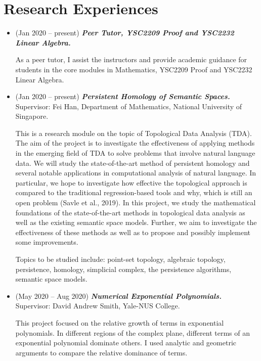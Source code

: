 \documentclass[11pt,reqno,oneside,a4paper]{article}
\begin{document}
	\section{Research Experiences}
	\begin{itemize}
		
		\item (Jan 2020 -- present) \emph{\textbf{Peer Tutor, \emph{YSC2209 Proof} and \emph{YSC2232 Linear Algebra}.}}
		
		\par As a peer tutor, I assist the instructors and provide academic guidance for students in the core modules in Mathematics, YSC2209 Proof and YSC2232 Linear Algebra. 
		
		\item (Jan 2020 -- present) \emph{\textbf{Persistent Homology of Semantic Spaces.}}\\
		Supervisor: Fei Han, Department of Mathematics, National University of Singapore.
		
		\par This is a research module on the topic of Topological Data Analysis (TDA). The aim of the project is to investigate the effectiveness of applying methods in the emerging field of TDA to solve problems that involve natural language data. We will study the state-of-the-art method of persistent homology and several notable applications in computational analysis of natural language. In particular, we hope to investigate how effective the topological approach is compared to the traditional regression-based tools and why, which is still an open problem (Savle et al., 2019). In this project, we study the mathematical foundations of the state-of-the-art methods in topological data analysis as well as the existing semantic space models. Further, we aim to investigate the effectiveness of these methods as well as to propose and possibly implement some improvements. 
		
		\par Topics to be studied include: point-set topology, algebraic topology, persistence, homology, simplicial  complex, the persistence algorithms, semantic space models.
		
		\item (May 2020 -- Aug 2020)  \emph{\textbf{Numerical Exponential Polynomials.}}\\
		\hspace{0.2in}Supervisor: David Andrew Smith, Yale-NUS College.
		
		\par This project focused on the relative growth of terms in exponential polynomials. In different regions of the complex plane, different terms of an exponential polynomial dominate others. I used analytic and geometric arguments to compare the relative dominance of terms.
		

\end{itemize}
\end{document}
